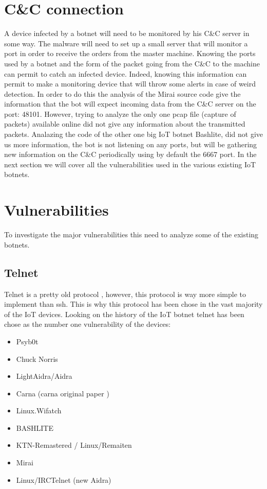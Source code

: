 \documentclass{report}
\begin{document}
\section{C\&C connection}
A device infected by a botnet will need to be monitored by his C\&C server in some way. The malware will need to set up a small server that will monitor a port in order to receive the orders from the master machine. Knowing the ports used by a botnet and the form of the packet going from the C\&C to the machine can permit to catch an infected device. Indeed, knowing this information can permit to make a monitoring device that will throw some alerts in case of weird detection.\newline
In order to do this the analysis of the Mirai source code give the information that the bot will expect incoming data from the C\&C server on the port: 48101.
However, trying to analyze the only one pcap file (capture of packets) available online did not give any information about the transmitted packets.
Analazing the code of the other one big IoT botnet Bashlite, did not give us more information, the bot is not listening on any ports, but will be gathering new information on the C\&C periodically using by default the 6667 port.\newline
In the next section we will cover all the vulnerabilities used in the various existing IoT botnets.

\section{Vulnerabilities}
\label{sec:vulnerabilities}
To investigate the major vulnerabilities this need to analyze some of the existing botnets.

\subsection{Telnet}
Telnet is a pretty old protocol \autocite{davidson1977arpanet}, however, this protocol is way more simple to implement than ssh. This is why this protocol has been chose in the vast majority of the IoT devices. Looking on the history of the IoT botnet telnet has been chose as the number one vulnerability of the devices:

\begin{itemize}
 \item Psyb0t \autocite{durfina2013psybot}
 \item Chuck Norris \autocite{celeda2010embedded}
 \item LightAidra/Aidra \autocite{aidra}
 \item Carna \autocite{krenc2014internet} (carna original paper \autocite{carna})
 \item Linux.Wifatch \autocite{wifatch}
 \item BASHLITE \autocite{bashlite}
 \item KTN-Remastered / Linux/Remaiten \autocite{remaiten}
 \item Mirai \autocite{kolias2017ddos}
 \item Linux/IRCTelnet (new Aidra) \autocite{irctelnet}
\end{itemize}
\end{document}
